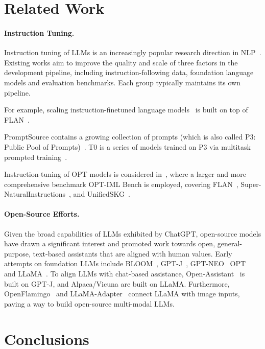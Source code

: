\section{Related Work}
\label{sec:related_work}
\paragraph{Instruction Tuning.} Instruction tuning of LLMs is an increasingly popular research direction in NLP~\citep{zhong2021adapting,ouyang2022training, wei2021finetuned}. Existing works aim to improve the quality and scale of three factors in the development pipeline, including instruction-following data, foundation language models and evaluation benchmarks. Each group typically maintains its own pipeline.

For example, scaling instruction-finetuned language models~\citep{chung2022scaling} is built on top of FLAN~\citep{wei2021finetuned}.

PromptSource contains a growing collection of prompts (which is also called P3: Public Pool of Prompts)~\citep{bach2022promptsource}. T0 is a series of models trained on P3 via multitask prompted training~\citep{sanh2021multitask}.

Instruction-tuning of OPT models is considered in~\citep{iyer2022opt}, where a larger and more comprehensive benchmark OPT-IML Bench is employed, covering FLAN~\citep{wei2021finetuned}, Super-NaturalInstructions~\citep{wang2022benchmarking}, and UnifiedSKG~\citep{xie2022unifiedskg}.

\paragraph{Open-Source Efforts.} Given the broad capabilities of LLMs exhibited by ChatGPT, open-source models have drawn  a significant interest and promoted work towards open, general-purpose, text-based assistants that are aligned with human values. Early attempts on foundation LLMs include BLOOM~\citep{scao2022bloom}, GPT-J~\citep{gpt-j}, GPT-NEO~\citep{gpt-neo} OPT~\citep{zhang2022opt} and LLaMA~\citep{zhang2023llama}. To align LLMs with chat-based assistance, Open-Assistant~\citep{openassistant} is built on GPT-J, and Alpaca/Vicuna are built on LLaMA. Furthermore, OpenFlamingo~\citep{anas_awadalla_2023_7733589} and LLaMA-Adapter~\citep{zhang2023llama} connect LLaMA with image inputs, paving a way to build open-source multi-modal LLMs. 

\section{Conclusions}

